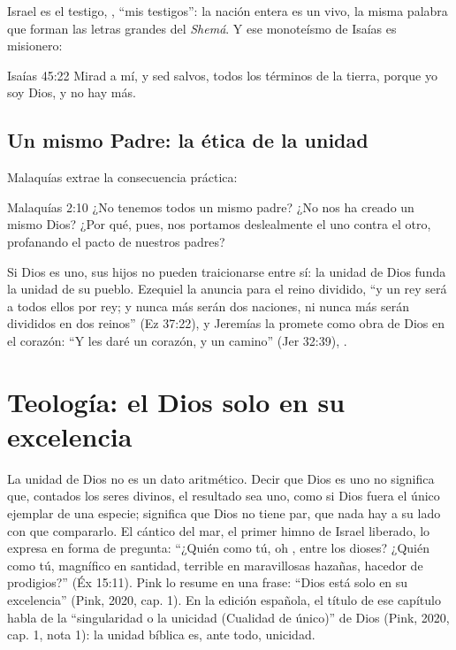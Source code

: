 Israel es el testigo, , ``mis testigos'': la nación entera es un  vivo, la misma palabra que forman las letras grandes del \emph{Shemá}. Y ese monoteísmo de Isaías es misionero:

\begin{verso}{Isaías 45:22}
Mirad a mí, y sed salvos, todos los términos de la tierra, porque yo soy Dios, y no hay más.
\end{verso}

\subsection{Un mismo Padre: la ética de la unidad}
Malaquías extrae la consecuencia práctica:

\begin{verso}{Malaquías 2:10}
¿No tenemos todos un mismo padre? ¿No nos ha creado un mismo Dios? ¿Por qué, pues, nos portamos deslealmente el uno contra el otro, profanando el pacto de nuestros padres?
\end{verso}

Si Dios es uno, sus hijos no pueden traicionarse entre sí: la unidad de Dios funda la unidad de su pueblo. Ezequiel la anuncia para el reino dividido, ``y un rey será a todos ellos por rey; y nunca más serán dos naciones, ni nunca más serán divididos en dos reinos'' (Ez 37:22), y Jeremías la promete como obra de Dios en el corazón: ``Y les daré un corazón, y un camino'' (Jer 32:39), .

\section{Teología: el Dios solo en su excelencia}

La unidad de Dios no es un dato aritmético. Decir que Dios es uno no significa que, contados los seres divinos, el resultado sea uno, como si Dios fuera el único ejemplar de una especie; significa que Dios no tiene par, que nada hay a su lado con que compararlo. El cántico del mar, el primer himno de Israel liberado, lo expresa en forma de pregunta: ``¿Quién como tú, oh \SENOR, entre los dioses? ¿Quién como tú, magnífico en santidad, terrible en maravillosas hazañas, hacedor de prodigios?'' (Éx 15:11). Pink lo resume en una frase: ``Dios está solo en su excelencia'' (Pink, 2020, cap. 1). En la edición española, el título de ese capítulo habla de la ``singularidad o la unicidad (Cualidad de único)'' de Dios (Pink, 2020, cap. 1, nota 1): la unidad bíblica es, ante todo, unicidad.

